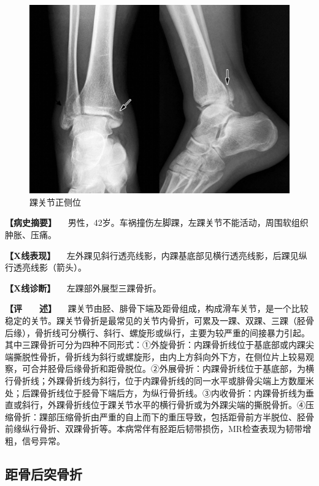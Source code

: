 \begin{figure}[!htbp]
 \centering
 \includegraphics{./images/Image00055.jpg}
 \captionsetup{justification=centering}
 \caption{踝关节正侧位}
 \label{fig2-3-28}
  \end{figure} 

\textbf{【病史摘要】}
　男性，42岁。车祸撞伤左脚踝，左踝关节不能活动，周围软组织肿胀、压痛。

\textbf{【X线表现】}
　左外踝见斜行透亮线影，内踝基底部见横行透亮线影，后踝见纵行透亮线影（箭头）。

\textbf{【X线诊断】} 　左踝部外展型三踝骨折。

\textbf{【评　　述】}
　踝关节由胫、腓骨下端及距骨组成，构成滑车关节，是一个比较稳定的关节。踝关节骨折是最常见的关节内骨折，可累及一踝、双踝、三踝（胫骨后缘），骨折线可分横行、斜行、螺旋形或纵行，主要为较严重的间接暴力引起。其中三踝骨折可分为四种不同形式：①外旋骨折：内踝骨折线位于基底部或内踝尖端撕脱性骨折，骨折线为斜行或螺旋形，由内上方斜向外下方，在侧位片上较易观察，可合并胫骨后缘骨折和距骨脱位。②外展骨折：内踝骨折线位于基底部，为横行骨折线；外踝骨折线为斜行，位于内踝骨折线的同一水平或腓骨尖端上方数厘米处；后踝骨折线位于胫骨下端后方，为纵行骨折线。③内收骨折：内踝骨折线为垂直或斜行，外踝骨折线位于踝关节水平的横行骨折或为外踝尖端的撕脱骨折。④压缩骨折：踝部压缩骨折由严重的自上而下的重压导致，包括距骨前方半脱位、胫骨前缘纵行骨折、双踝骨折等。本病常伴有胫距后韧带损伤，MR检查表现为韧带增粗，信号异常。

\subsection{距骨后突骨折}

